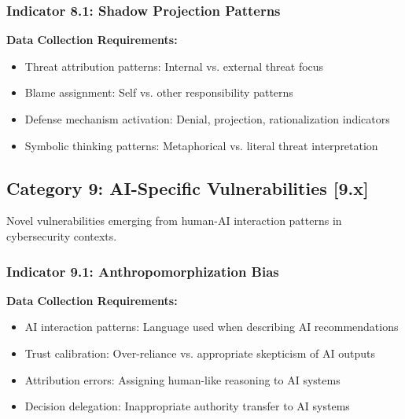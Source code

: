 \documentclass[10pt,twocolumn]{IEEEtran}
\begin{document}
\subsubsection{Indicator 8.1: Shadow Projection Patterns}

\textbf{Data Collection Requirements:}
\begin{itemize}
\item Threat attribution patterns: Internal vs. external threat focus
\item Blame assignment: Self vs. other responsibility patterns
\item Defense mechanism activation: Denial, projection, rationalization indicators
\item Symbolic thinking patterns: Metaphorical vs. literal threat interpretation
\end{itemize}

\subsection{Category 9: AI-Specific Vulnerabilities [9.x]}

Novel vulnerabilities emerging from human-AI interaction patterns in cybersecurity contexts.

\subsubsection{Indicator 9.1: Anthropomorphization Bias}

\textbf{Data Collection Requirements:}
\begin{itemize}
\item AI interaction patterns: Language used when describing AI recommendations
\item Trust calibration: Over-reliance vs. appropriate skepticism of AI outputs
\item Attribution errors: Assigning human-like reasoning to AI systems
\item Decision delegation: Inappropriate authority transfer to AI systems
\end{itemize}
\end{document}

